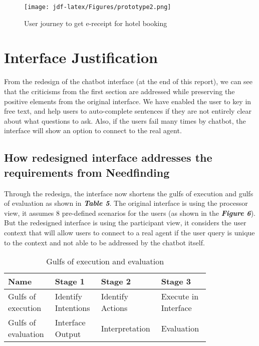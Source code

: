 \documentclass[
	letterpaper, %
]{jdf}
\begin{document}
\begin{figure}[hbt!]
	\centering
	\texttt{[image: jdf-latex/Figures/prototype2.png]}
	\caption{User journey to get e-receipt for hotel booking}
	\label{fig:wizard}
\end{figure}
\clearpage

\section{Interface Justification}
From the redesign of the chatbot interface (at the end of this report), we can see that the criticisms from the first section are addressed while preserving the positive elements from the original interface. We have enabled the user to key in free text, and help users to auto-complete sentences if they are not entirely clear about what questions to ask. Also, if the users fail many times by chatbot, the interface will show an option to connect to the real agent.

\subsection{How redesigned interface addresses the requirements from Needfinding}
Through the redesign, the interface now shortens the gulfs of execution and gulfs of evaluation as shown in \textit{\textbf{Table 5}}. The original interface is using the processor view, it assumes 8 pre-defined scenarios for the users (as shown in the \textit{\textbf{Figure 6}}). But the redesigned interface is using the participant view, it considers the user context that will allow users to connect to a real agent if the user query is unique to the context and not able to be addressed by the chatbot itself.

\begin{table}[h] %
	\caption{Gulfs of execution and evaluation}
	\small %
	\centering %
	\begin{tabular}{L{0.2\linewidth} C{0.2\linewidth} L{0.2\linewidth} L{0.2\linewidth}}
		\textbf{Name} & \textbf{Stage 1} & \textbf{Stage 2} & \textbf{Stage 3} \\
		\toprule[0.5pt]
		Gulfs of execution & Identify Intentions & Identify Actions & Execute in Interface\\
		\midrule
		Gulfs of evaluation & Interface Output & Interpretation & Evaluation\\
	\end{tabular}
\end{table}
\end{document}
